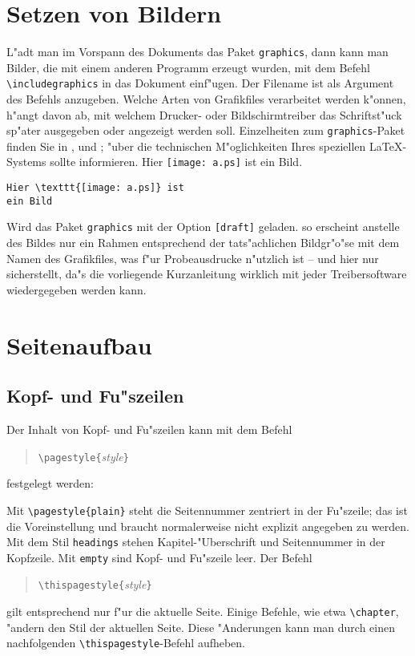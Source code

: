 
\section{Setzen von Bildern} \label{graphics}
L"adt man im Vorspann des Dokuments das Paket \texttt{graphics},
dann kann man Bilder, die mit einem anderen Programm erzeugt wurden, 
mit dem Befehl \verb|\includegraphics| in das Dokument einf"ugen.
Der Filename ist als Argument des Befehls anzugeben.
Welche Arten von Grafikfiles verarbeitet werden k"onnen, 
h"angt davon ab, mit welchem Drucker- oder Bildschirmtreiber 
das Schriftst"uck sp"ater ausgegeben oder angezeigt werden soll.
Einzelheiten zum \texttt{graphics}-Paket finden Sie in \cite{grfcomp},
\cite{grfguide} und \cite{epslatex};
"uber die technischen M"oglichkeiten Ihres speziellen
\LaTeX-Systems sollte \cite{local} informieren.
\exa
Hier \texttt{[image: a.ps]} ist ein Bild.
\exb
\begin{verbatim}
Hier \texttt{[image: a.ps]} ist
ein Bild
\end{verbatim}
\exc
Wird das Paket \texttt{graphics} mit der Option \texttt{[draft]} geladen.
so erscheint anstelle des Bildes nur ein Rahmen entsprechend
der tats"achlichen Bildgr"o"se mit dem Namen des
Grafikfiles, was f"ur Probeausdrucke n"utzlich ist -- und hier
nur sicherstellt, da"s die vorliegende Kurzanleitung wirklich mit jeder
Treibersoftware wiedergegeben werden kann.



\section{Seitenaufbau}

\subsection{Kopf- und Fu"szeilen} 
Der Inhalt von Kopf- und  Fu"szeilen kann mit dem Befehl
\begin{verse}
\verb|\pagestyle{|\textit{style}\verb|}|
\end{verse}
festgelegt werden:
 
Mit \verb|\pagestyle{plain}| steht
die Seitennummer zentriert in der Fu"szeile; 
das ist die Voreinstellung und braucht normalerweise nicht explizit 
angegeben zu werden.
Mit dem Stil \texttt{headings} stehen Kapitel-"Uberschrift und
Seitennummer in der Kopfzeile.
Mit \texttt{empty} sind Kopf- und Fu"szeile leer.  Der Befehl
\begin{verse}
\verb|\thispagestyle{|\textit{style}\verb|}|
\end{verse}
gilt entsprechend nur f"ur die aktuelle Seite.  Einige Befehle, wie etwa
\verb|\chapter|, "andern den Stil der aktuellen Seite.  Diese "Anderungen 
kann man durch einen nachfolgenden \verb|\thispagestyle|-Befehl aufheben.

